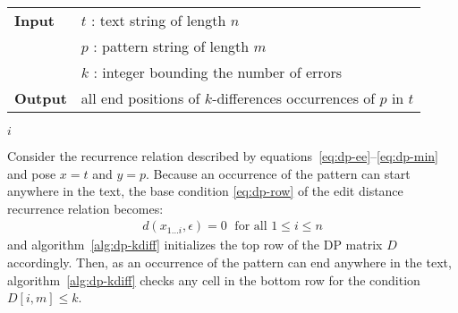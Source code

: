 \begin{figure*}[h]
\begin{center}
\begin{minipage}[t]{.9\textwidth}
\begin{algorithm}[H]
\begin{tabular}{ll}
\textbf{Input}  & $t$ : text string of length $n$\\
				& $p$ : pattern string of length $m$\\
				& $k$ : integer bounding the number of errors\\
\textbf{Output} & all end positions of $k$-differences occurrences of $p$ in $t$\\
\end{tabular}
\begin{algorithmic}[1]
\EndFor
{}
	\EndFor
		\State \Report $i$
	\EndIf
\EndFor
\end{algorithmic}
\label{alg:dp-kdiff}
\end{algorithm}
\end{minipage}
\end{center}
\end{figure*}

Consider the recurrence relation described by equations~\ref{eq:dp-ee}--\ref{eq:dp-min} and pose $x=t$ and $y=p$.
Because an occurrence of the pattern can start anywhere in the text, the base condition \ref{eq:dp-row} of the edit distance recurrence relation becomes:
\begin{eqnarray}
d(x_{1 \dots i}, \epsilon) = 0 \; \text{ for all } 1 \leq i \leq n\label{eq:dp-row-kdiff}
\end{eqnarray}
and algorithm~\ref{alg:dp-kdiff} initializes the top row of the DP matrix $D$ accordingly.
Then, as an occurrence of the pattern can end anywhere in the text, algorithm~\ref{alg:dp-kdiff} checks any cell in the bottom row for the condition $D[i,m] \leq k$.

%

